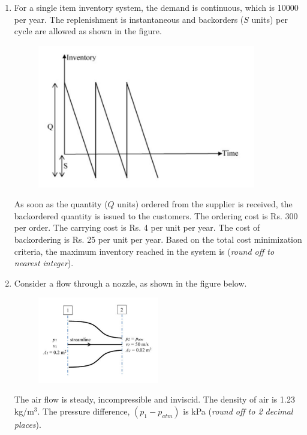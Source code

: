 \documentclass[12pt,onecolumn]{article}
\begin{document}
\begin{enumerate}
    \item For a single item inventory system, the demand is continuous, which is 10000 per year. The replenishment is instantaneous and backorders ($S$ units) per cycle are allowed as shown in the figure.
          \begin{figure}[H]
              \centering
              \includegraphics[width=0.9\textwidth]{q47s2}
              \label{fig:q47s2}
          \end{figure}
          As soon as the quantity ($Q$ units) ordered from the supplier is received, the backordered quantity is issued to the customers. The ordering cost is Rs. 300 per order. The carrying cost is Rs. 4 per unit per year. The cost of backordering is Rs. 25 per unit per year. Based on the total cost minimization criteria, the maximum inventory reached in the system is \underline{\hspace{2cm}} (\textit{round off to nearest integer}).

    \item Consider a flow through a nozzle, as shown in the figure below.
          \begin{figure}[H]
              \centering
              \includegraphics[width=0.5\textwidth]{q48s2}
              \label{fig:q48s2}
          \end{figure}
          The air flow is steady, incompressible and inviscid. The density of air is 1.23 kg/m$^3$. The pressure difference, $(p_1 - p_{atm})$ is \underline{\hspace{2cm}} kPa (\textit{round off to 2 decimal places}).


\end{enumerate}
\end{document}
